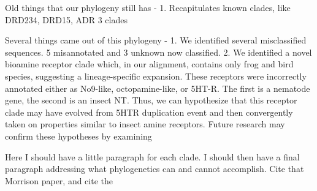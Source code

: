 \documentclass[fleqn,10pt]{wlpeerj}
\begin{document}
Old things that our phylogeny still has - 
1. Recapitulates known clades, like DRD234, DRD15, ADR 3 clades 


Several things came out of this phylogeny - 
1. We identified several misclassified sequences. 5 misannotated and 3 unknown now classified. 
2. We identified a novel bioamine receptor clade which, in our alignment, contains only frog and bird species, suggesting a lineage-specific expansion. These receptors were incorrectly annotated either as No9-like, octopamine-like, or 5HT-R. The first is a nematode gene, the second is an insect NT. Thus, we can hypothesize that this receptor clade may have evolved from 5HTR duplication event and then convergently taken on properties similar to insect amine receptors. Future research may confirm these hypotheses by examining
 

 

Here I should have a little paragraph for each clade. I should then have a final paragraph addressing what phylogenetics can and cannot accomplish. Cite that Morrison paper, and cite the
\end{document}
